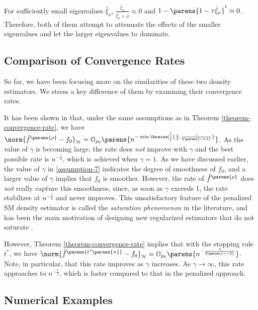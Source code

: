 For sufficiently small eigenvalues $\hat{\xi}_{\nu}$, $\frac{\hat{\xi}_{\nu}}{\hat{\xi}_{\nu} + \rho} \approx 0$ and $1 - \parens{1 - \tau \hat{\xi}_{\nu} }^{t} \approx 0$. Therefore, both of them attempt to attenuate the effects of the smaller eigenvalues and let the larger eigenvalues to dominate. 

\subsection{Comparison of Convergence Rates}

So far, we have been focusing more on the similarities of these two density estimators. We stress a key difference of them by examining their convergence rates. 

It has been shown in \textcite{Sriperumbudur-density-estimation-inf-exp-family} that, under the same assumptions as in Theorem \ref{theorem-convergence-rate}, we have $\norm{\hat{f}^{\parens{\rho}} - f_0}_{\calH} = \calO_{p_0} \parens{n^{-\min \braces[\big]{\frac{1}{4}, \frac{\gamma}{2 \parens{\gamma + 1}}}}}$. As the value of $\gamma$ is becoming large, the rate does \emph{not} improve with $\gamma$ and the best possible rate is $n^{-\frac{1}{4}}$, which is achieved when $\gamma = 1$. As we have discussed earlier, the value of $\gamma$ in \ref{assumption-7} indicates the degree of smoothness of $f_0$, and a larger value of $\gamma$ implies that $f_0$ is smoother. However, the rate of $\hat{f}^{\parens{\rho}}$ does \emph{not} really capture this smoothness, since, as soon as $\gamma$ exceeds 1, the rate stabilizes at $n^{-\frac{1}{4}}$ and never improves. This unsatisfactory feature of the penalized SM density estimator is 
called the \emph{saturation phenomenon} in the literature, and has been the main motivation of designing new regularized estimators that do not saturate \parencite{Engl1996-jy,Bauer2007-xq,Lo_Gerfo2008-vv}. 

However, Theorem \ref{theorem-convergence-rate} implies that with the stopping rule $t^*$, we have $\norm{\hat{f}^{\parens{t^* \parens{n}}} - f_0}_{\calH} = \calO_{p_0} \parens{n^{-\frac{\gamma}{2 \parens{\gamma+2}}}}$. Note, in particular, that this rate improves as $\gamma$ increases. As $\gamma \to \infty$, this rate approaches to $n^{-\frac{1}{2}}$, which is faster compared to that in the penalized approach. 


\subsection{Numerical Examples}


